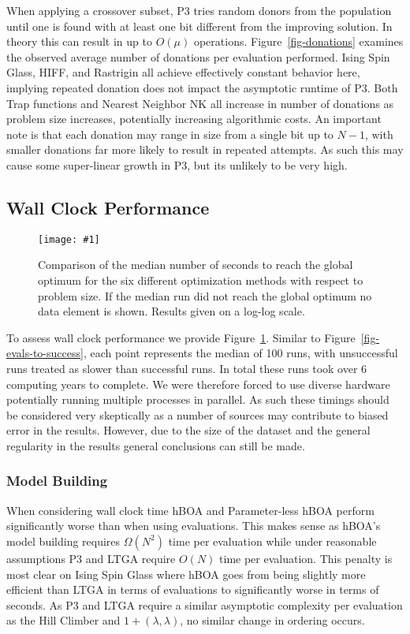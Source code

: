\documentclass[twoside]{article}
\newcommand{\includegraphicsfit}[1]
{\texttt{[image: \#1]}}
\begin{document}
When applying a crossover subset, P3 tries random donors from the population until one is found with at least
one bit different from the improving solution. In theory this can result in up to $O(\mu)$ operations.
Figure~\ref{fig-donations} examines the observed average number of donations per evaluation performed.
Ising Spin Glass, HIFF, and Rastrigin all achieve effectively constant behavior here, implying repeated
donation does not impact the asymptotic runtime of P3. Both Trap functions and Nearest Neighbor NK all
increase in number of donations as problem size increases, potentially increasing algorithmic costs. An
important note is that each donation may range in size from a single bit up to $N-1$, with smaller
donations far more likely to result in repeated attempts. As such this may cause some super-linear growth
in P3, but its unlikely to be very high.

\subsection{Wall Clock Performance}
\begin{figure}
  \begin{center}
  \includegraphicsfit{seconds-to-success}
  \end{center}
  \caption{Comparison of the median number of seconds to reach the global optimum for
           the six different optimization methods with respect
           to problem size.  If the median run did not reach the global optimum no data element
           is shown.  Results given on a log-log scale.}
  \label{fig-seconds-to-success}
\end{figure}


To assess wall clock performance we provide Figure~\ref{fig-seconds-to-success}.
Similar to Figure~\ref{fig-evals-to-success}, each point represents the median
of 100 runs, with unsuccessful runs treated as slower than successful runs.
In total these runs
took over 6 computing years to complete. We were therefore forced to use
diverse hardware potentially running multiple processes in parallel.
As such these timings should be considered very skeptically as a number
of sources may contribute to biased error in the results. However, due to
the size of the dataset and the general regularity in the results general conclusions
can still be made.

\subsubsection{Model Building}
When considering wall clock time hBOA and Parameter-less hBOA perform significantly worse than when using
evaluations. This makes sense as hBOA's model building requires $\Omega(N^2)$ time per evaluation while under reasonable
assumptions P3 and LTGA require $O(N)$ time per evaluation. This penalty is most clear on Ising Spin Glass where
hBOA goes from being slightly more efficient than LTGA in terms of evaluations to significantly worse in terms of seconds.
As P3 and LTGA require a similar asymptotic complexity per
evaluation as the Hill Climber and $1+(\lambda, \lambda)$, no similar change in ordering occurs.
\end{document}
